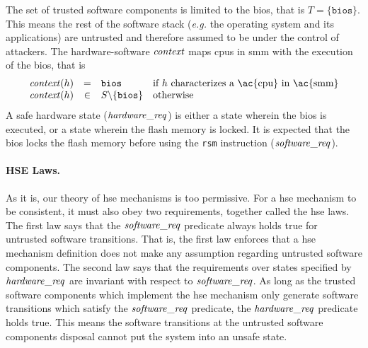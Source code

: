\begin{example}
  \label{example:speccert:flashdef}
  The set of trusted software components is limited to the \ac{bios}, that is
  \( T = \{ \mathtt{bios} \} \).
  This means the rest of the software stack (\emph{e.g.} the operating system
  and its applications) are untrusted and therefore assumed to be under the
  control of attackers.
  The hardware-software \( \mathit{context} \) maps \acp{cpu} in \ac{smm} with the
  execution of the \ac{bios}, that is
  \[
    \begin{array}{rcll}
      \func{context}(h) & = & \mathtt{bios} & \text{if } h \text{ characterizes
                                              a \ac{cpu} in \ac{smm}} \\
      \func{context}(h) & \in & S \backslash \{ \mathtt{bios} \} & \text{otherwise}
    \end{array}
  \]
  A safe hardware state ($\mathit{hardware\_req}$) is either a state wherein the
  \ac{bios} is executed, or a state wherein the flash memory is locked.
  It is expected that the \ac{bios} locks the flash memory before using the
  \texttt{rsm} instruction ($\mathit{software\_req}$).
\end{example}

\paragraph{HSE Laws.}
%
As it is, our theory of \ac{hse} mechanisms is too permissive.
%
For a \ac{hse} mechanism to be consistent, it must also obey two requirements,
together called the \ac{hse} laws.
%
The first law says that the $\mathit{software\_req}$ predicate always holds true
for untrusted software transitions.
%
That is, the first law enforces that a \ac{hse} mechanism definition does not
make any assumption regarding untrusted software components.
%
The second law says that the requirements over states specified by
$\mathit{hardware\_req}$ are invariant with respect to $\mathit{software\_req}$.
%
As long as the trusted software components which implement the \ac{hse}
mechanism only generate software transitions which satisfy the
$\mathit{software\_req}$ predicate, the $\mathit{hardware\_req}$ predicate holds
true.
%
This means the software transitions at the untrusted software components
disposal cannot put the system into an unsafe state.


